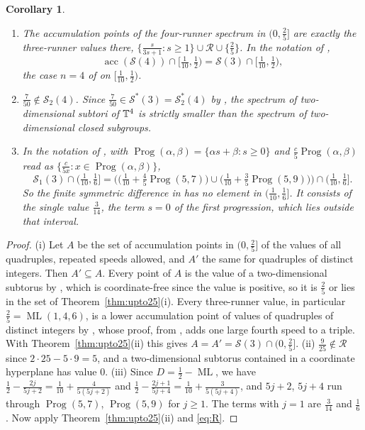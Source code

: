 \documentclass[12pt]{amsart}
\newtheorem{corollary}[theorem]{Corollary}
\theoremstyle{definition}\newtheorem{definition}[theorem]{Definition}
\theoremstyle{remark}\newtheorem{remark}[theorem]{Remark}
\newcommand{\ML}{\operatorname{ML}}
\begin{document}
\begin{corollary}\label{cor:acc25}
\begin{enumerate}[label=\textup{(\roman*)},leftmargin=*]
\item The accumulation points of the four-runner spectrum in $(0,\frac25]$ are exactly the three-runner values there, $\{\frac s{3s+1}:s\ge1\}\cup\mathcal R\cup\{\frac25\}$. In the notation of \cite{GiriKravitz},
\[
 \operatorname{acc}(\mathcal S(4))\cap[\tfrac1{10},\tfrac12)=\mathcal S(3)\cap[\tfrac1{10},\tfrac12),
\]
the case $n=4$ of \cite[Conjecture~1.5]{GiriKravitz} on $[\frac1{10},\frac12)$.
\item $\frac7{50}\notin\mathcal S_2(4)$. Since $\frac7{50}\in\mathcal S^*(3)=\mathcal S^*_2(4)$ by \cite[Proposition~8.1 and Lemma~3.2]{GiriKravitz}, the spectrum of two-dimensional subtori of $\mathbb T^4$ is strictly smaller than the spectrum of two-dimensional closed subgroups.
\item In the notation of \cite{JainKravitz}, with $\operatorname{Prog}(\alpha,\beta)=\{\alpha s+\beta:s\ge0\}$ and $\frac c{5}\operatorname{Prog}(\alpha,\beta)$ read as $\{\frac c{5x}:x\in\operatorname{Prog}(\alpha,\beta)\}$,
\[
 \mathcal S_1(3)\cap(\tfrac1{10},\tfrac16]=\Big(\big(\tfrac1{10}+\tfrac45\operatorname{Prog}(5,7)\big)\cup\big(\tfrac1{10}+\tfrac35\operatorname{Prog}(5,9)\big)\Big)\cap(\tfrac1{10},\tfrac16].
\]
So the finite symmetric difference in \cite[Theorem~1.4]{JainKravitz} has no element in $(\frac1{10},\frac16]$. It consists of the single value $\frac3{14}$, the term $s=0$ of the first progression, which lies outside that interval.
\end{enumerate}
\end{corollary}
\begin{proof}
(i) Let $A$ be the set of accumulation points in $(0,\frac25]$ of the values of all quadruples, repeated speeds allowed, and $A'$ the same for quadruples of distinct integers. Then $A'\subseteq A$. Every point of $A$ is the value of a two-dimensional subtorus by \cite[Theorem~1.4]{GiriKravitz}, which is coordinate-free since the value is positive, so it is $\frac25$ or lies in the set of Theorem~\ref{thm:upto25}(i). Every three-runner value, in particular $\frac25=\ML(1,4,6)$, is a lower accumulation point of values of quadruples of distinct integers by \cite[Theorem~1.3]{GiriKravitz}, whose proof, from \cite{Kravitz}, adds one large fourth speed to a triple. With Theorem~\ref{thm:upto25}(ii) this gives $A=A'=\mathcal S(3)\cap(0,\frac25]$. (ii) $\frac9{25}\notin\mathcal R$ since $2\cdot25-5\cdot9=5$, and a two-dimensional subtorus contained in a coordinate hyperplane has value $0$. (iii) Since $D=\frac12-\ML$, we have $\frac12-\frac{2j}{5j+2}=\frac1{10}+\frac4{5(5j+2)}$ and $\frac12-\frac{2j+1}{5j+4}=\frac1{10}+\frac3{5(5j+4)}$, and $5j+2$, $5j+4$ run through $\operatorname{Prog}(5,7)$, $\operatorname{Prog}(5,9)$ for $j\ge1$. The terms with $j=1$ are $\frac3{14}$ and $\frac16$. Now apply Theorem~\ref{thm:upto25}(ii) and \eqref{eq:R}.
\end{proof}
\end{document}
